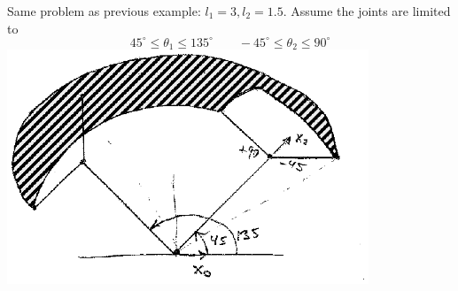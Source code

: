 \begin{ExampleSmall}
Same problem as previous example:  $l_1 = 3, l_2 = 1.5$.    Assume the joints are limited to
\[
45^{\circ} \le \theta_1 \le 135^{\circ}   \qquad   -45^{\circ} \le \theta_2 \le 90^{\circ}
\]
\includegraphics[width=4.25in]{figs04/00446.eps}
\end{ExampleSmall}


